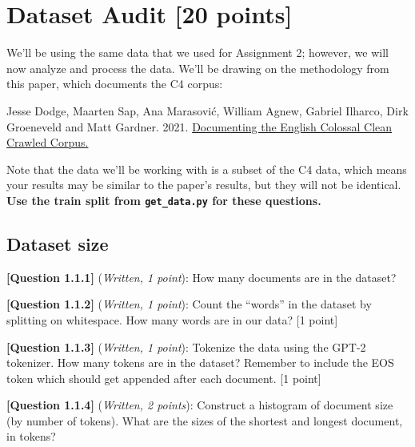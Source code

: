 \documentclass[leqno,12pt]{article}
\begin{document}
\section{Dataset Audit [20 points]}
\noindent We'll be using the same data that we used for Assignment 2; however, we will now analyze and process the data. We'll be drawing on the methodology from this paper, which documents the C4 corpus:

Jesse Dodge, Maarten Sap, Ana Marasović, William Agnew, Gabriel Ilharco, Dirk Groeneveld and Matt Gardner. 2021. \href{https://www.semanticscholar.org/paper/Documenting-the-English-Colossal-Clean-Crawled-Dodge-Sap/40c3327a6ddb0603b6892344509c7f428ab43d81}{Documenting the English Colossal Clean Crawled Corpus.} 

Note that the data we'll be working with is a subset of the C4 data, which means your results may be similar to the paper's results, but they will not be identical.  \textbf{Use the train split from \texttt{get\_data.py} for these questions.}

\subsection{Dataset size}
\noindent \textbf{[Question 1.1.1]} (\emph{Written, 1 point}): How many documents are in the dataset? 
\begin{tcolorbox}[fit,height=1cm, width=\linewidth, blank, borderline={1pt}{-2pt}]
\end{tcolorbox}

\noindent \textbf{[Question 1.1.2]} (\emph{Written, 1 point}): Count the ``words'' in the dataset by splitting on whitespace. How many words are in our data? [1 point]
\begin{tcolorbox}[fit,height=1cm, width=\linewidth, blank, borderline={1pt}{-2pt}]
\end{tcolorbox}

\noindent \textbf{[Question 1.1.3]} (\emph{Written, 1 point}): Tokenize the data using the GPT-2 tokenizer. How many tokens are in the dataset? Remember to include the EOS token which should get appended after each document. [1 point]
\begin{tcolorbox}[fit,height=1cm, width=\linewidth, blank, borderline={1pt}{-2pt}]
\end{tcolorbox}

\noindent \textbf{[Question 1.1.4]} (\emph{Written, 2 points}): Construct a histogram of document size (by number of tokens). What are the sizes of the shortest and longest document, in tokens? 
\begin{tcolorbox}[fit,height=9cm, width=\linewidth, blank, borderline={1pt}{-2pt}]
\end{tcolorbox}
\end{document}
